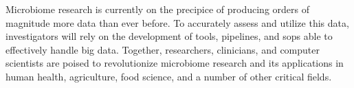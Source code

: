 Microbiome research is currently on the precipice of producing orders of magnitude more data than ever before. To accurately assess and utilize this data, investigators will rely on the development of tools, pipelines, and \gls{sop}s able to effectively handle big data. Together, researchers, clinicians, and computer scientists are poised to revolutionize microbiome research and its applications in human health, agriculture, food science, and a number of other critical fields.
